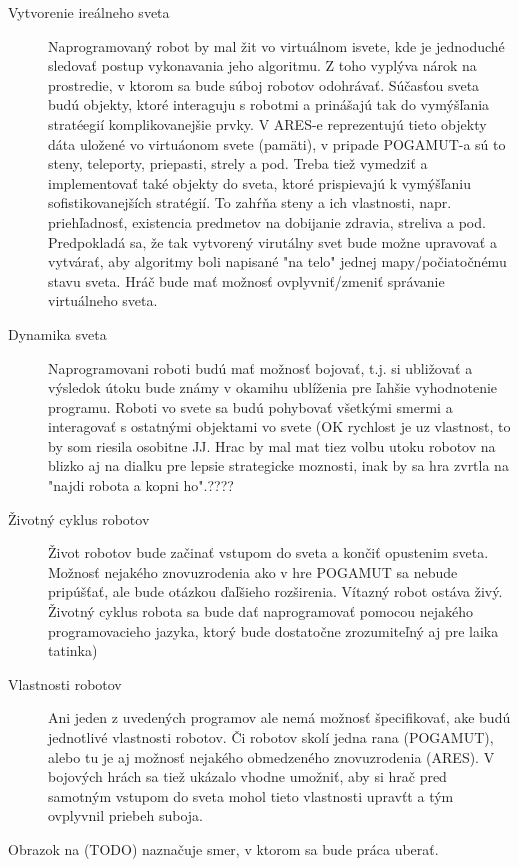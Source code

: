 \begin{description}
\item [Vytvorenie ireálneho  sveta]
Naprogramovaný robot by mal žit vo virtuálnom isvete, kde je jednoduché sledovať postup vykonavania jeho algoritmu. Z toho vyplýva nárok na prostredie, v ktorom sa bude súboj robotov odohrávať. Súčasťou sveta budú objekty, ktoré interaguju s robotmi a prinášajú tak do vymýšľania stratéegií komplikovanejšie prvky. V ARES-e reprezentujú tieto objekty dáta uložené vo virtuáonom  svete (pamäti), v pripade POGAMUT-a sú to steny, teleporty, priepasti, strely a pod. Treba tiež vymedziť a implementovať také objekty do sveta, ktoré prispievajú k vymýšľaniu sofistikovanejších stratégií. To zahŕňa steny a ich vlastnosti, napr. priehľadnosť, existencia predmetov na dobijanie zdravia, streliva a pod. Predpokladá sa, že tak vytvorený virutálny  svet bude možne upravovať a vytvárať, aby algoritmy boli napisané "na telo" jednej mapy/počiatočnému stavu sveta. Hráč bude mať možnosť ovplyvniť/zmeniť správanie  virtuálneho sveta.\item [Dynamika sveta] 
Naprogramovani roboti budú mať možnosť bojovať,  t.j. si ubližovať a výsledok útoku bude známy v okamihu ublíženia pre ľahšie vyhodnotenie programu. Roboti vo svete sa budú pohybovať všetkými smermi a interagovať s ostatnými objektami vo svete (OK rychlost je uz vlastnost, to by som riesila osobitne JJ. Hrac by mal mat tiez volbu utoku robotov na blizko aj na dialku pre lepsie strategicke moznosti, inak by sa hra zvrtla na "najdi robota a kopni ho".????
\item [Životný cyklus robotov]
Život robotov bude začinať vstupom do sveta a končiť opustenim sveta. Možnosť nejakého znovuzrodenia ako v hre POGAMUT sa nebude pripúšťať, ale bude otázkou ďaľšieho rozširenia. Vítazný robot ostáva živý.  Životný cyklus robota sa bude dať naprogramovať pomocou nejakého programovacieho jazyka, ktorý bude dostatočne zrozumiteľný aj pre laika tatinka)
\item [Vlastnosti robotov] 
Ani jeden z uvedených programov ale nemá možnosť špecifikovať, ake budú  jednotlivé  vlastnosti robotov. Či robotov skolí jedna rana (POGAMUT),  alebo tu je aj možnosť nejakého obmedzeného znovuzrodenia (ARES). V bojových  hrách sa tiež ukázalo vhodne umožniť, aby si hrač pred samotným vstupom do sveta mohol tieto  vlastnosti upravťt a tým ovplyvnil priebeh suboja.
\end{description}
Obrazok na (TODO) naznačuje smer, v ktorom sa bude práca uberať. 
